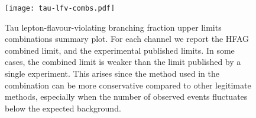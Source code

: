 \begin{figure}[tb]
  \begin{center}
    \texttt{[image: tau-lfv-combs.pdf]}
    \caption{Tau lepton-flavour-violating branching fraction upper limits
      combinations summary plot. For each channel we report the HFAG
      combined limit, and the experimental published limits. In some cases,
      the combined limit is weaker than the limit published by a single
      experiment. This arises since the \cls method used in the
      combination can be more conservative compared to other legitimate
      methods, especially when the number of observed events fluctuates below the
      expected background.
      \label{fig:tau:lfv-limits-plot-average}
    }
  \end{center}
\end{figure}


